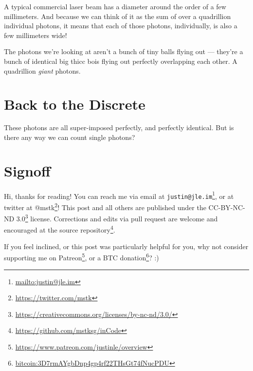 \documentclass[]{article}
\renewcommand{\href}[2]{#2\footnote{\url{#1}}}
\begin{document}
A typical commercial laser beam has a diameter around the order of a few
millimeters. And because we can think of it as the sum of over a quadrillion
individual photons, it means that each of those photons, individually, is also a
few millimeters wide!

The photons we're looking at aren't a bunch of tiny balls flying out --- they're
a bunch of identical big thicc bois flying out perfectly overlapping each other.
A quadrillion \emph{giant} photons.

\hypertarget{back-to-the-discrete}{%
\section{Back to the Discrete}\label{back-to-the-discrete}}

These photons are all super-imposed perfectly, and perfectly identical. But is
there any way we can count single photons?

\hypertarget{signoff}{%
\section{Signoff}\label{signoff}}

Hi, thanks for reading! You can reach me via email at
\href{mailto:justin@jle.im}{\nolinkurl{justin@jle.im}}, or at twitter at
\href{https://twitter.com/mstk}{@mstk}! This post and all others are published
under the \href{https://creativecommons.org/licenses/by-nc-nd/3.0/}{CC-BY-NC-ND
3.0} license. Corrections and edits via pull request are welcome and encouraged
at \href{https://github.com/mstksg/inCode}{the source repository}.

If you feel inclined, or this post was particularly helpful for you, why not
consider \href{https://www.patreon.com/justinle/overview}{supporting me on
Patreon}, or a \href{bitcoin:3D7rmAYgbDnp4gp4rf22THsGt74fNucPDU}{BTC donation}?
:)
\end{document}
